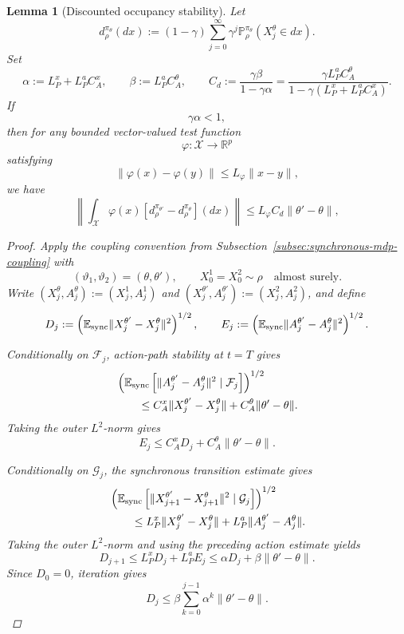 \documentclass{article}
\newtheorem{lem}[thm]{Lemma}
\theoremstyle{definition}
\theoremstyle{remark}
\theoremstyle{mystyle}
\newcommand{\1}{\mathbbm{1}}
\begin{document}
\begin{lem}[Discounted occupancy stability]
\label{lem:discounted-occupancy-stability}
Let
\[
d_\rho^{\pi_\theta}(dx)
:=
(1-\gamma)\sum_{j=0}^{\infty}\gamma^j
\mathbb P_\rho^{\pi_\theta}(X_j^\theta\in dx).
\]
Set
\[
\alpha:=L_P^x+L_P^aC_A^x,
\qquad
\beta:=L_P^aC_A^\theta,
\qquad
C_d
:=
\frac{\gamma\beta}{1-\gamma\alpha}
=
\frac{\gamma L_P^aC_A^\theta}
{1-\gamma(L_P^x+L_P^aC_A^x)}.
\]
If
\[
\gamma\alpha<1,
\tag{4.7-c}
\]
then for any bounded vector-valued test function
\[
\varphi:\mathcal X\to\mathbb R^p
\]
satisfying
\[
\|\varphi(x)-\varphi(y)\|
\le
L_\varphi\|x-y\|,
\]
we have
\[
\left\|
\int_{\mathcal X}\varphi(x)
\left[
d_\rho^{\pi_{\theta'}}-d_\rho^{\pi_\theta}
\right](dx)
\right\|
\le
L_\varphi C_d\|\theta'-\theta\|,
\tag{4.7}
\]


\begin{proof}
Apply the coupling convention from
Subsection~\ref{subsec:synchronous-mdp-coupling} with
\[
(\vartheta_1,\vartheta_2)=(\theta,\theta'),
\qquad
X_0^1=X_0^2\sim\rho
\quad\text{almost surely}.
\]
Write \((X_j^\theta,A_j^\theta):=(X_j^1,A_j^1)\) and
\((X_j^{\theta'},A_j^{\theta'}):=(X_j^2,A_j^2)\), and define
\[
D_j
:=
\left(
\mathbb E_{\rm sync}
\|X_j^{\theta'}-X_j^\theta\|^2
\right)^{1/2},
\qquad
E_j
:=
\left(
\mathbb E_{\rm sync}
\|A_j^{\theta'}-A_j^\theta\|^2
\right)^{1/2}.
\]

Conditionally on \(\mathcal F_j\), action-path stability at \(t=T\)
gives
\[
\begin{aligned}
&\left(
\mathbb E_{\rm sync}\left[
\|A_j^{\theta'}-A_j^\theta\|^2
\mid\mathcal F_j
\right]
\right)^{1/2}
\\
&\qquad\le
C_A^x\|X_j^{\theta'}-X_j^\theta\|
+
C_A^\theta\|\theta'-\theta\|.
\end{aligned}
\]
Taking the outer \(L^2\)-norm gives
\[
E_j
\le
C_A^xD_j+C_A^\theta\|\theta'-\theta\|.
\]

Conditionally on \(\mathcal G_j\), the synchronous transition estimate
gives
\[
\begin{aligned}
&\left(
\mathbb E_{\rm sync}\left[
\|X_{j+1}^{\theta'}-X_{j+1}^\theta\|^2
\mid\mathcal G_j
\right]
\right)^{1/2}
\\
&\qquad\le
L_P^x\|X_j^{\theta'}-X_j^\theta\|
+
L_P^a\|A_j^{\theta'}-A_j^\theta\|.
\end{aligned}
\]
Taking the outer \(L^2\)-norm and using the preceding action estimate
yields
\[
D_{j+1}
\le
L_P^xD_j+L_P^aE_j
\le
\alpha D_j+\beta\|\theta'-\theta\|.
\tag{4.8}
\]
Since \(D_0=0\), iteration gives
\[
D_j
\le
\beta
\sum_{k=0}^{j-1}\alpha^k
\|\theta'-\theta\|.
\tag{4.9}
\]


\end{proof}
\end{lem}
\end{document}
